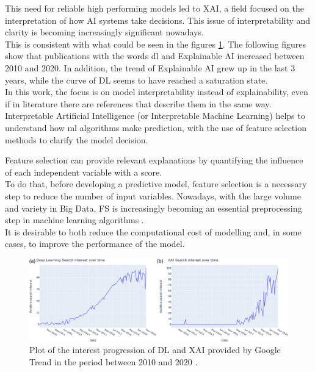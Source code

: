 This need for reliable high performing models led to XAI, a field focused on the interpretation of how AI systems take decisions.
This issue of interpretability and clarity is becoming increasingly significant nowadays. \\
This is consistent with what could be seen in the figures \ref{fig:AI_XAI}.
The following figures show that publications with the words \gls{dl} and Explainable AI increased between 2010 and 2020. 
In addition, the trend of Explainable AI grew up in the last 3 years, while the curve of DL seems to have reached a saturation state.\\
In this work, the focus is on model interpretability instead of explainability, even if in literature there are references that describe them in the same way.\\
Interpretable Artificial Intelligence (or Interpretable Machine Learning) helps to understand how \acrshort{ml} algorithms make prediction, with the use of feature selection methods to clarify the model decision.\par
Feature selection can provide relevant explanations by quantifying the influence of each independent variable with a score.\\
To do that, before developing a predictive model, feature selection is a necessary step to reduce the number of input variables. \newline
Nowadays, with the large volume and variety in Big Data, FS is increasingly becoming an essential preprocessing step in machine learning algorithms \cite{kamolov2021feature}.\\
It is desirable to both reduce the computational cost of modelling and, in some cases, to improve the performance of the model.\newline
\begin{figure}[H]
\centering
    \includegraphics[scale=0.30]{images/DL-XAI.jpg}
    \caption{Plot of the interest progression of DL and XAI provided by Google Trend in the period between 2010 and 2020 \cite{angelov2021explainable}.}
    \label{fig:AI_XAI}
\end{figure}
